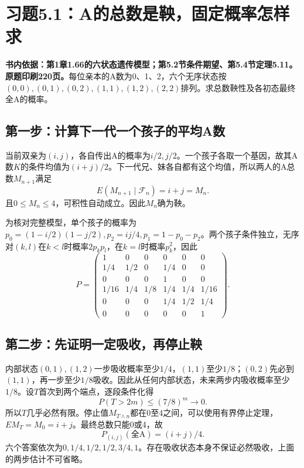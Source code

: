 \documentclass[11pt,a4paper,UTF8,fontset=fandol]{ctexart}
\begin{document}
\clearpage

\section{习题5.1：A的总数是鞅，固定概率怎样求}\label{ux4e60ux98985.1aux7684ux603bux6570ux662fux9785ux56faux5b9aux6982ux7387ux600eux6837ux6c42}

\textbf{书内依据：第1章1.66的六状态遗传模型；第5.2节条件期望、第5.4节定理5.11。原题印刷220页。}每位亲本的A数为0、1、2，六个无序状态按\((0,0),(0,1),(0,2),(1,1),(1,2),(2,2)\)排列。求总数鞅性及各初态最终全A的概率。

\subsection{第一步：计算下一代一个孩子的平均A数}\label{ux7b2cux4e00ux6b65ux8ba1ux7b97ux4e0bux4e00ux4ee3ux4e00ux4e2aux5b69ux5b50ux7684ux5e73ux5747aux6570}

当前双亲为\((i,j)\)，各自传出A的概率为\(i/2,j/2\)。一个孩子各取一个基因，故其A数\(K\)的条件均值为\((i+j)/2\)。下一代兄、妹各自都有这个均值，所以两人的A总数\(M_{n+1}\)满足
\[E(M_{n+1}\mid\mathcal F_n)=i+j=M_n.\]
且\(0\le M_n\le4\)，可积性自动成立。因此\(M_n\)确为鞅。

为核对完整模型，单个孩子的概率为\(p_0=(1-i/2)(1-j/2),p_2=ij/4,p_1=1-p_0-p_2\)。两个孩子条件独立，无序对\((k,l)\)在\(k<l\)时概率\(2p_kp_l\)，在\(k=l\)时概率\(p_k^2\)，因此
\[P=\begin{pmatrix}
1&0&0&0&0&0\\
1/4&1/2&0&1/4&0&0\\
0&0&0&1&0&0\\
1/16&1/4&1/8&1/4&1/4&1/16\\
0&0&0&1/4&1/2&1/4\\
0&0&0&0&0&1
\end{pmatrix}.\]

\subsection{第二步：先证明一定吸收，再停止鞅}\label{ux7b2cux4e8cux6b65ux5148ux8bc1ux660eux4e00ux5b9aux5438ux6536ux518dux505cux6b62ux9785}

内部状态\((0,1),(1,2)\)一步吸收概率至少\(1/4\)，\((1,1)\)至少\(1/8\)；\((0,2)\)先必到\((1,1)\)，再一步至少\(1/8\)吸收。因此从任何内部状态，未来两步内吸收概率至少\(1/8\)。设\(T\)首次到两个端点，逐段条件化得
\[P(T>2m)\le(7/8)^m\to0.\]
所以\(T\)几乎必然有限。停止值\(M_{T\wedge n}\)都在0至4之间，可以使用有界停止定理，\(EM_T=M_0=i+j\)。最终总数只能0或4，故
\[\boxed{P_{(i,j)}(\text{全A})=(i+j)/4.}\]
六个答案依次为\(\boxed{0,1/4,1/2,1/2,3/4,1}\)。存在吸收状态本身不保证必然吸收，上面的两步估计不可省略。
\end{document}
